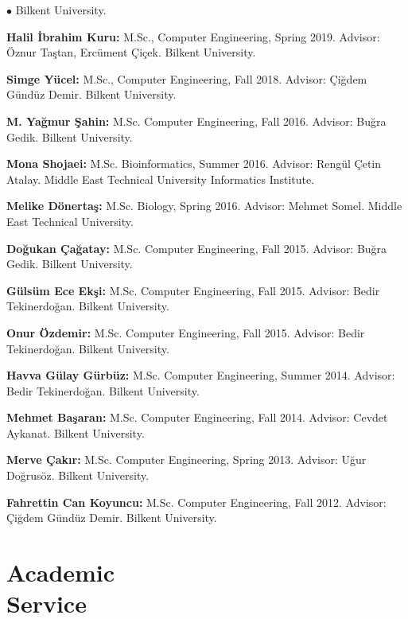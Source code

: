 \documentclass[margin,line]{res}
\newenvironment{list2}{
  \begin{list}{$\bullet$}{%
      \setlength{\itemsep}{0.1cm}
      \setlength{\parsep}{0in} \setlength{\parskip}{0in}
      \setlength{\topsep}{0in} \setlength{\partopsep}{0in} 
      \setlength{\leftmargin}{0.2in}}}{\end{list}}
\begin{document}
\begin{resume}
\begin{list2}
  Bilkent University.
\item
{\bf  Halil İbrahim Kuru:} M.Sc., Computer Engineering, Spring 2019.
  Advisor: Öznur Taştan, Ercüment Çiçek.
  Bilkent University.
\item
  {\bf Simge Yücel:} M.Sc., Computer Engineering, Fall 2018.
  Advisor: Çiğdem Gündüz Demir.
  Bilkent University.
\item
  {\bf M. Yağmur Şahin:} M.Sc. Computer Engineering, Fall 2016. Advisor: Buğra Gedik.
  Bilkent University. 
\item
  {\bf Mona Shojaei:} M.Sc. Bioinformatics,  Summer 2016. Advisor: Rengül Çetin Atalay.
  Middle East Technical University Informatics Institute.
\item
  {\bf Melike Dönertaş:} M.Sc. Biology, Spring 2016. Advisor: Mehmet Somel.
  Middle East Technical University. 
\item
  {\bf Doğukan Çağatay:} M.Sc. Computer Engineering,  Fall 2015. Advisor: Buğra Gedik.
  Bilkent University. 
\item
  {\bf Gülsüm Ece Ekşi:} M.Sc. Computer Engineering,  Fall 2015. Advisor: Bedir Tekinerdoğan.
Bilkent University. 

\clearpage
\item
  {\bf Onur Özdemir:} M.Sc. Computer Engineering,  Fall 2015. Advisor: Bedir Tekinerdoğan.
  Bilkent University. 
\item
  {\bf Havva Gülay Gürbüz:} M.Sc. Computer Engineering, Summer 2014. Advisor: Bedir Tekinerdoğan.
  Bilkent University. 
 \item
  {\bf Mehmet Başaran:} M.Sc. Computer Engineering, Fall 2014. Advisor: Cevdet Aykanat.
  Bilkent University. 
\item
  {\bf Merve Çakır:} M.Sc. Computer Engineering, Spring 2013. Advisor: Uğur Doğrusöz.
  Bilkent University.
\item
  {\bf Fahrettin Can Koyuncu:} M.Sc. Computer Engineering, Fall 2012. Advisor: Çiğdem Gündüz Demir.
  Bilkent University. 
  \end{list2}


\vspace*{-.2cm}
\section{\sc Academic \\ Service}
\vspace{-0.3cm}

\end{resume}
\end{document}
